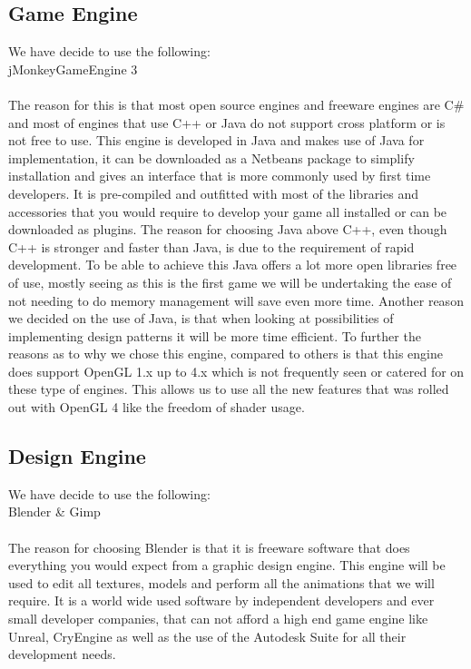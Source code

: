 \documentclass[letterpaper]{article}
\begin{document}
			
			\subsection*{Game Engine}
			
			\vspace{0.1cm}
			
			We have decide to use the following: \\
			\indent jMonkeyGameEngine 3 \\
			\\
			The reason for this is that most open source engines and freeware engines are C\# and most of engines that use C++ or Java do not support cross platform or is not free to use. This engine is developed in Java and makes use of Java for implementation, it can be downloaded as a Netbeans package to simplify installation and gives an interface that is more commonly used by first time developers. It is pre-compiled and outfitted with most of the libraries and accessories that you would require to develop your game all installed or can be downloaded as plugins. The reason for choosing Java above C++, even though C++ is stronger and faster than Java, is due to the requirement of rapid development. To be able to achieve this Java offers a lot more open libraries free of use, mostly seeing as this is the first game we will be undertaking the ease of not needing to do memory management will save even more time. Another reason we decided on the use of Java, is that when looking at possibilities of implementing design patterns it will be more time efficient. To further the reasons as to why we chose this engine, compared to others is that this engine does support OpenGL 1.x up to 4.x which is not frequently seen or catered for on these type of engines. This allows us to use all the new features that was rolled out with OpenGL 4 like the freedom of shader usage.
			
			\vspace{0.1cm}
			
			\subsection*{Design Engine}
			
			\vspace{0.1cm}
			
			We have decide to use the following: \\
			\indent Blender \& Gimp \\
			\\
			The reason for choosing Blender is that it is freeware software that does everything you would expect from a graphic design engine. This engine will be used to edit all textures, models and perform all the animations that we will require. It is a world wide used software by independent developers and ever small developer companies, that can not afford a high end game engine like Unreal, CryEngine as well as the use of the Autodesk Suite for all their development needs.
			
\end{document}
